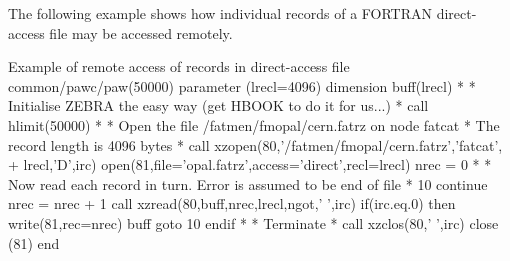 The following example shows how individual records of
a FORTRAN direct-access file may be
accessed remotely.
\begin{XMPt}{Example of remote access of records in direct-access file}
      common/pawc/paw(50000)
      parameter (lrecl=4096)
      dimension buff(lrecl)
*
*     Initialise ZEBRA the easy way (get HBOOK to do it for us...)
*
      call hlimit(50000)
*
*     Open the file /fatmen/fmopal/cern.fatrz on node fatcat
*     The record length is 4096 bytes
*
      call xzopen(80,'/fatmen/fmopal/cern.fatrz','fatcat',
     +            lrecl,'D',irc)
      open(81,file='opal.fatrz',access='direct',recl=lrecl)
      nrec = 0
*
*     Now read each record in turn. Error is assumed to be end of file
*
10    continue
      nrec = nrec + 1
      call xzread(80,buff,nrec,lrecl,ngot,' ',irc)
      if(irc.eq.0) then
         write(81,rec=nrec) buff
         goto 10
      endif
*
*     Terminate
*
      call xzclos(80,' ',irc)
      close (81)
      end
\end{XMPt}
